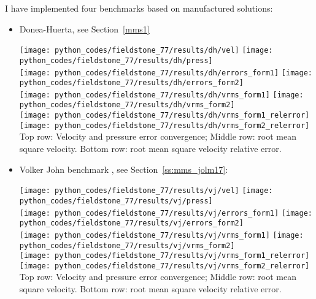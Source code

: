 I have implemented four benchmarks based on manufactured solutions:
\begin{itemize}
\item Donea-Huerta, see Section~\ref{mms1}

\begin{center}
\texttt{[image: python\_codes/fieldstone\_77/results/dh/vel]}
\texttt{[image: python\_codes/fieldstone\_77/results/dh/press]}\\
\texttt{[image: python\_codes/fieldstone\_77/results/dh/errors\_form1]}
\texttt{[image: python\_codes/fieldstone\_77/results/dh/errors\_form2]}\\
\texttt{[image: python\_codes/fieldstone\_77/results/dh/vrms\_form1]}
\texttt{[image: python\_codes/fieldstone\_77/results/dh/vrms\_form2]}\\
\texttt{[image: python\_codes/fieldstone\_77/results/dh/vrms\_form1\_relerror]}
\texttt{[image: python\_codes/fieldstone\_77/results/dh/vrms\_form2\_relerror]}\\
{\captionfont Top row: Velocity and pressure error convergence; 
Middle row: root mean square velocity. 
Bottom row: root mean square velocity relative error.}
\end{center}

\item Volker John benchmark \cite{jolm17}, see Section~\ref{ss:mms_jolm17}:

\begin{center}
\texttt{[image: python\_codes/fieldstone\_77/results/vj/vel]}
\texttt{[image: python\_codes/fieldstone\_77/results/vj/press]}\\
\texttt{[image: python\_codes/fieldstone\_77/results/vj/errors\_form1]}
\texttt{[image: python\_codes/fieldstone\_77/results/vj/errors\_form2]}\\
\texttt{[image: python\_codes/fieldstone\_77/results/vj/vrms\_form1]}
\texttt{[image: python\_codes/fieldstone\_77/results/vj/vrms\_form2]}\\
\texttt{[image: python\_codes/fieldstone\_77/results/vj/vrms\_form1\_relerror]}
\texttt{[image: python\_codes/fieldstone\_77/results/vj/vrms\_form2\_relerror]}\\
{\captionfont Top row: Velocity and pressure error convergence; 
Middle row: root mean square velocity. 
Bottom row: root mean square velocity relative error.}
\end{center}


\end{itemize}
